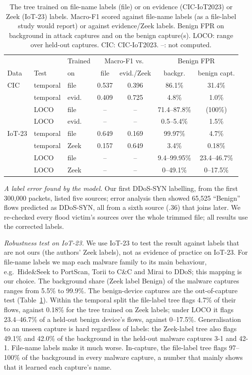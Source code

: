 \begin{table}[t]
\centering
\caption{The tree trained on file-name labels (file) or on evidence (CIC-IoT2023) or Zeek (IoT-23) labels. Macro-F1 scored against file-name labels (as a file-label study would report) or against evidence/Zeek labels. Benign FPR on background in attack captures and on the benign capture(s). LOCO: range over held-out captures. CIC: CIC-IoT2023. --: not computed.}
\label{tab:filelabel}
\footnotesize
\setlength{\tabcolsep}{2.6pt}
\begin{tabular}{lllcccc}
\hline
 & & Trained & \multicolumn{2}{c}{Macro-F1 vs.} & \multicolumn{2}{c}{Benign FPR} \\
Data & Test & on & file & evid./Zeek & backgr. & benign capt. \\
\hline
CIC & temporal & file  & 0.537 & 0.396 & 86.1\% & 31.4\% \\
            & temporal & evid. & 0.409 & 0.725 & 4.8\% & 1.0\% \\
            & LOCO     & file  & --    & --    & 71.4--87.8\% & (100\%) \\
            & LOCO     & evid. & --    & --    & 0.5--5.4\% & 1.5\% \\
\hline
IoT-23      & temporal & file  & 0.649 & 0.169 & 99.97\% & 4.7\% \\
            & temporal & Zeek  & 0.157 & 0.649 & 3.4\% & 0.18\% \\
            & LOCO     & file  & --    & --    & 9.4--99.95\% & 23.4--46.7\% \\
            & LOCO     & Zeek  & --    & --    & 0--49.1\% & 0--17.5\% \\
\hline
\end{tabular}
\end{table}

\emph{A label error found by the model.} Our first DDoS-SYN labelling, from the first 300,000 packets, listed five sources; error analysis then showed 65,525 ``Benign'' flows predicted as DDoS-SYN, all from a sixth source (.36) that joins later. We re-checked every flood victim's sources over the whole trimmed file; all results use the corrected labels.

\emph{Robustness test on IoT-23.} We use IoT-23 to test the result against labels that are not ours (the authors' Zeek labels), not as evidence of practice on IoT-23. For file-name labels we map each malware family to its main behaviour, e.g.\ Hide\&Seek to PortScan, Torii to C\&C and Mirai to DDoS; this mapping is our choice. The background share (Zeek label Benign) of the malware captures ranges from 5.5\% to 99.9\%. The benign-device captures are the out-of-capture test (Table~\ref{tab:filelabel}). Within the temporal split the file-label tree flags 4.7\% of their flows, against 0.18\% for the tree trained on Zeek labels; under LOCO it flags 23.4--46.7\% of a held-out benign device's flows, against 0--17.5\%. Generalisation to an unseen capture is hard regardless of labels: the Zeek-label tree also flags 49.1\% and 42.0\% of the background in the held-out malware captures 3-1 and 42-1. File-name labels make it much worse. In-capture, the file-label tree flags 97--100\% of the background in every malware capture, a number that mainly shows that it learned each capture's name.

